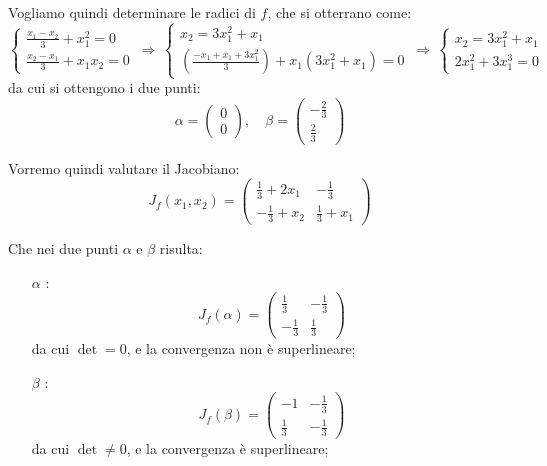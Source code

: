 \documentclass[a4paper,11pt]{article}
\begin{document}
\par\smallskip

Vogliamo quindi determinare le radici di $f$, che si otterrano come:
\[
	\begin{cases}
		\frac{x_1 - x_2}{3} + x_1^2 = 0 \\
		\frac{x_2 - x_1}{3} + x_1 x_2 = 0
	\end{cases}
	\, \Rightarrow \,
	\begin{cases}
		x_2 = 3 x_1^2 + x_1 \\
		\left( \frac{- x_1 + x_1 + 3 x_1^2}{3} \right) + x_1 (3 x_1^2 + x_1) = 0
	\end{cases}
	\, \Rightarrow \,
	\begin{cases}
		x_2 = 3 x_1^2 + x_1 \\
		2x_1^2 + 3x_1^3 = 0
	\end{cases}
\]
da cui si ottengono i due punti:
$$
\alpha = \begin{pmatrix}
0 \\ 0
\end{pmatrix}, \quad
\beta = \begin{pmatrix}
	-\frac{2}{3} \\ \frac{2}{3}
\end{pmatrix}
$$

\par\smallskip

Vorremo quindi valutare il Jacobiano:
$$
J_f(x_1, x_2) =
\begin{pmatrix}
	\frac{1}{3} + 2 x_1 & -\frac{1}{3} \\
	-\frac{1}{3} + x_2 & \frac{1}{3} + x_1
\end{pmatrix}
$$

Che nei due punti $\alpha$ e $\beta$ risulta:
\begin{itemize}
	\item[$\alpha$]:
		$$
		J_f(\alpha) =
		\begin{pmatrix}
			\frac{1}{3} & -\frac{1}{3} \\ 
			-\frac{1}{3} & \frac{1}{3}
		\end{pmatrix}
		$$
		da cui $\det = 0$, e la convergenza non è superlineare;
	\item[$\beta$]:
		$$
		J_f(\beta) =
		\begin{pmatrix}
			-1 & -\frac{1}{3} \\ 
			\frac{1}{3} & -\frac{1}{3}
		\end{pmatrix}
		$$
		da cui $\det \neq 0$, e la convergenza è superlineare;
\end{itemize}
\end{document}
